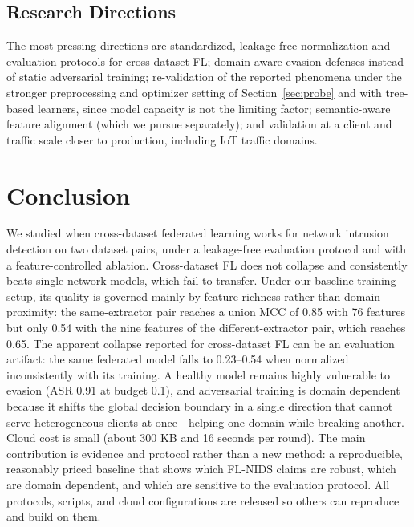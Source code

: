 \documentclass[conference,onecolumn]{IEEEtran}
\begin{document}
\subsection{Research Directions}
The most pressing directions are standardized, leakage-free normalization and evaluation protocols for
cross-dataset FL; domain-aware evasion defenses instead of static adversarial training; re-validation of
the reported phenomena under the stronger preprocessing and optimizer setting of
Section~\ref{sec:probe} and with tree-based learners, since model capacity is not the limiting factor; semantic-aware feature alignment (which we pursue separately); and validation at
a client and traffic scale closer to production, including IoT traffic domains.

\section{Conclusion}
We studied when cross-dataset federated learning works for network intrusion detection on two dataset
pairs, under a leakage-free evaluation protocol and with a feature-controlled ablation. Cross-dataset FL
does not collapse and consistently beats single-network models, which fail to transfer. Under our baseline training setup, its quality is
governed mainly by feature richness rather than domain proximity: the same-extractor pair reaches a
union MCC of 0.85 with 76 features but only 0.54 with the nine features of the different-extractor
pair, which reaches 0.65. The apparent collapse reported for cross-dataset FL can be an evaluation
artifact: the same federated model falls to 0.23--0.54 when normalized inconsistently with its
training. A healthy model remains highly vulnerable to evasion (ASR 0.91 at budget 0.1), and
adversarial training is domain dependent because it shifts the global decision boundary in a single
direction that cannot serve heterogeneous clients at once---helping one domain while breaking another.
Cloud cost is small (about 300 KB and 16 seconds per round). The main contribution is evidence and
protocol rather than a new method: a reproducible, reasonably priced baseline that shows which FL-NIDS
claims are robust, which are domain dependent, and which are sensitive to the evaluation protocol. All
protocols, scripts, and cloud configurations are released so others can reproduce and build on them.
\end{document}
